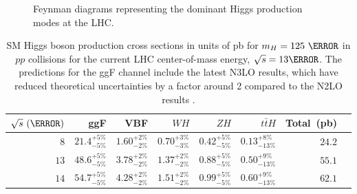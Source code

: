 \begin{figure}[!htbp]
{{\begin{tikzpicture}[thick]
\end{tikzpicture}
}}

\caption{Feynman diagrams representing the dominant Higgs production modes at
the LHC.}

\label{fig:higgs_production}
\end{figure}

\begin{table}[htpb]
 \centering
 \caption{ SM Higgs boson production cross sections in units of pb for
$m_{H}=125~\GeV$ in $pp$ collisions for the current LHC center-of-mass energy,
$\sqrt{s} = 13\TeV$.  The predictions for the ggF channel include the latest
N3LO results, which have reduced theoretical uncertainties by a factor around 2
compared to the N2LO results \cite{PDG2018:Ch11}.}
 \begin{tabular}{@{}rrrrrrrr@{}} \toprule
  $\sqrt{s}~(\TeV)$ & ggF                  & VBF                  & $WH$                 & $ZH$                 & $t\bar{t}H$            & Total~(pb) \\ \midrule
  $8$               & $21.4_{-5\%}^{+5\%}$ & $1.60_{-2\%}^{+2\%}$ & $0.70_{-3\%}^{+3\%}$ & $0.42_{-5\%}^{+5\%}$ & $0.13_{-13\%}^{+8\%}$ &  $24.2$    \\
  \addlinespace[0.3em]
  $13$              & $48.6_{-5\%}^{+5\%}$ & $3.78_{-2\%}^{+2\%}$ & $1.37_{-2\%}^{+2\%}$ & $0.88_{-5\%}^{+5\%}$ & $0.50_{-13\%}^{+9\%}$ &  $55.1$    \\
  \addlinespace[0.3em]
  $14$              & $54.7_{-5\%}^{+5\%}$ & $4.28_{-2\%}^{+2\%}$ & $1.51_{-2\%}^{+2\%}$ & $0.99_{-5\%}^{+5\%}$ & $0.60_{-13\%}^{+9\%}$ &  $62.1$    \\
  \bottomrule
 \end{tabular}\label{table:higgs_production_xsection}
\end{table}

